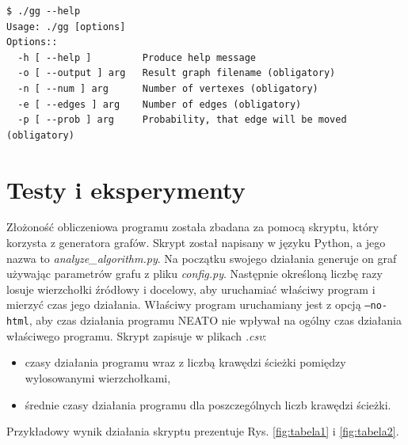 \documentclass[a4paper, 12pt]{article}
\begin{document}
\begin{verbatim}
$ ./gg --help
Usage: ./gg [options]
Options::
  -h [ --help ]         Produce help message
  -o [ --output ] arg   Result graph filename (obligatory)
  -n [ --num ] arg      Number of vertexes (obligatory)
  -e [ --edges ] arg    Number of edges (obligatory)
  -p [ --prob ] arg     Probability, that edge will be moved (obligatory)
\end{verbatim}

\section{Testy i eksperymenty}

Złożoność obliczeniowa programu została zbadana za pomocą skryptu, który korzysta z generatora grafów. Skrypt został napisany w języku Python, a jego nazwa to {\it analyze\_algorithm.py}. Na początku swojego działania generuje on graf używając parametrów grafu z pliku {\it config.py}. Następnie określoną liczbę razy losuje wierzchołki źródłowy i docelowy, aby uruchamiać właściwy program i mierzyć czas jego działania. Właściwy program uruchamiany jest z opcją \texttt{--no-html}, aby czas działania programu NEATO nie wpływał na ogólny czas działania właściwego programu. Skrypt zapisuje w plikach {\it *.csv}:

\begin{itemize}
\item czasy działania programu wraz z liczbą krawędzi ścieżki pomiędzy wylosowanymi wierzchołkami,
\item średnie czasy działania programu dla poszczególnych liczb krawędzi ścieżki.
\end{itemize}

Przykładowy wynik działania skryptu prezentuje Rys. \ref{fig:tabela1} i \ref{fig:tabela2}.
\end{document}
